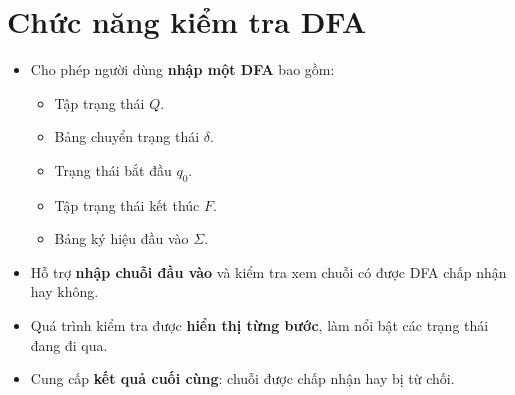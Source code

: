 \documentclass[12pt,a4paper]{report}
\begin{document}
\section{Chức năng kiểm tra DFA}

\begin{itemize}
    \item Cho phép người dùng \textbf{nhập một DFA} bao gồm:
    \begin{itemize}
        \item Tập trạng thái $Q$.
        \item Bảng chuyển trạng thái $\delta$.
        \item Trạng thái bắt đầu $q_0$.
        \item Tập trạng thái kết thúc $F$.
        \item Bảng ký hiệu đầu vào $\Sigma$.
    \end{itemize}
    \item Hỗ trợ \textbf{nhập chuỗi đầu vào} và kiểm tra xem chuỗi có được DFA chấp nhận hay không.
    \item Quá trình kiểm tra được \textbf{hiển thị từng bước}, làm nổi bật các trạng thái đang đi qua.
    \item Cung cấp \textbf{kết quả cuối cùng}: chuỗi được chấp nhận hay bị từ chối.
\end{itemize}
\end{document}
